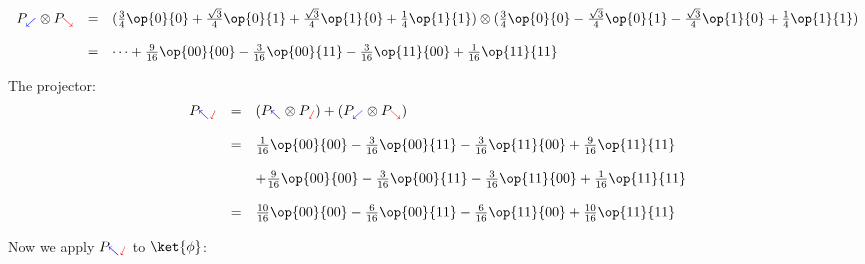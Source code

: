 \documentclass{article}
\newcommand{\yplus}{{\color{blue}\nwarrow}}
\newcommand{\yminus}{{\color{blue}\swarrow}}
\newcommand{\zplus}{{\color{red}\sswarrow}}
\newcommand{\zminus}{{\color{red}\searrow}}
\theoremstyle{remark}
\begin{document}
\[
    \begin{array}{rcl}
    P_{\yminus}\otimes P_{\zminus}
        &=& (\frac{3}{4} \op{0}{0} 
            + \frac{\sqrt{3}}{4} \op{0}{1} 
            + \frac{\sqrt{3}}{4} \op{1}{0} 
            + \frac{1}{4} \op{1}{1})
            \otimes 
          (\frac{3}{4} \op{0}{0} 
            - \frac{\sqrt{3}}{4} \op{0}{1} 
            - \frac{\sqrt{3}}{4} \op{1}{0} 
            + \frac{1}{4} \op{1}{1})
            \\ \\
        &=& \dots 
        + \frac{9}{16}\op{00}{00}
        - \frac{3}{16}\op{00}{11}
        - \frac{3}{16}\op{11}{00}
        + \frac{1}{16}\op{11}{11} 
    \end{array}
\]


The projector:
\[
    \begin{array}{rcl}
        P_{\yplus\zplus} 
        &=& (P_{\yplus}\otimes P_{\zplus}) + (P_{\yminus} \otimes P_{\zminus}) 
        \\ \\
        &=& \frac{1}{16}\op{00}{00}
        - \frac{3}{16}\op{00}{11}
        - \frac{3}{16}\op{11}{00}
        + \frac{9}{16}\op{11}{11} 
        \\ \\
        &&
        + \frac{9}{16}\op{00}{00}
        - \frac{3}{16}\op{00}{11}
        - \frac{3}{16}\op{11}{00}
        + \frac{1}{16}\op{11}{11} 
        \\ \\
        &=& 
          \frac{10}{16}\op{00}{00}
        - \frac{6}{16}\op{00}{11}
        - \frac{6}{16}\op{11}{00}
        + \frac{10}{16}\op{11}{11} 
    \end{array}
\]

Now we apply $P_{\yplus\zplus}$ to $\ket{\phi}$:
\end{document}
